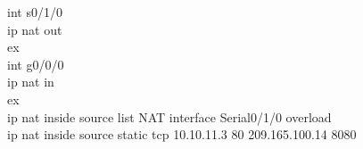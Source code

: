 \documentclass[a4paper, 12pt]{article}
\begin{document}
{\hspace*{2cm}int s0/1/0\\
\hspace*{2cm}ip nat out\\
\hspace*{2cm}ex\\
\hspace*{2cm}int g0/0/0\\
\hspace*{2cm}ip nat in\\
\hspace*{2cm}ex\\
\hspace*{2cm}ip nat inside source list NAT interface Serial0/1/0 overload\\
\hspace*{2cm}ip nat inside source static tcp 10.10.11.3 80 209.165.100.14 8080\\}
\end{document}
